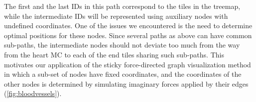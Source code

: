 The first and the last IDs in this path correspond to the tiles in the treemap, while the intermediate IDs will be represented using auxiliary nodes with undefined coordinates. One of the issues we encountered is the need to determine optimal positions for these nodes. Since several paths as above can have common sub-paths, the intermediate nodes should not deviate too much from the way from the heart MC to each of the end tiles sharing such sub-paths. This motivates our application of the sticky force-directed graph visualization method~\cite{FR91,Bos14} in which a sub-set of nodes have fixed coordinates, and the coordinates of the other nodes is determined by simulating imaginary forces applied by their edges (\cref{fig:bloodvessels}).

